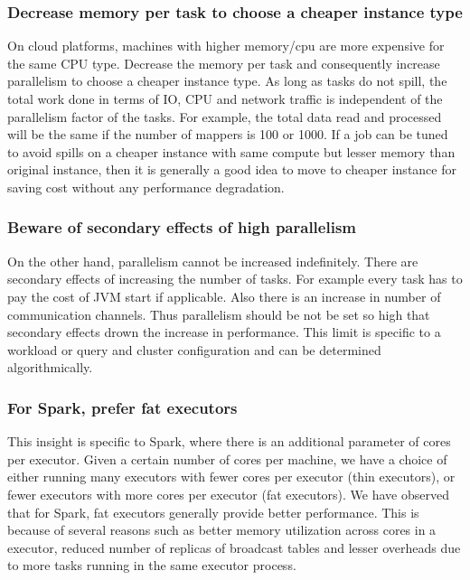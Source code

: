 \noindent\subsubsection*{\bf Decrease memory per task to choose a cheaper instance type}
On cloud platforms, machines with higher memory/cpu are more expensive for the same CPU type. Decrease the memory per task and consequently increase parallelism to choose a cheaper instance type. As long as tasks do not spill, the total work done in terms of IO, CPU and network traffic is independent of the parallelism factor of the tasks. For example, the total data read and processed will be the same if the number of mappers is 100 or 1000.  If a job can be tuned to avoid spills on a cheaper instance with same compute but lesser memory than original instance, then it is generally a good idea to move to cheaper instance for saving cost without any performance degradation. 

\noindent\subsubsection*{\bf Beware of secondary effects of high parallelism}
On the other hand, parallelism cannot be increased indefinitely. There are secondary effects of increasing the number of tasks. For example every task has to pay the cost of JVM start if applicable. Also there is an increase in number of communication channels. Thus parallelism should be not be set so high that secondary effects drown the increase in performance. This limit is specific to a workload or query and cluster configuration and can be determined algorithmically. 

\noindent\subsubsection*{\bf For Spark, prefer fat executors}
This insight is specific to Spark, where there is an additional parameter of cores per executor. Given a certain number of cores per machine, we have a choice of either running many executors with fewer cores per executor (thin executors), or fewer executors with more cores per executor (fat executors). We have observed that for Spark, fat executors generally provide better performance. This is because of several reasons such as  better memory utilization across cores in a executor, reduced number of replicas of broadcast tables and lesser overheads due to more tasks running in the same executor process.


